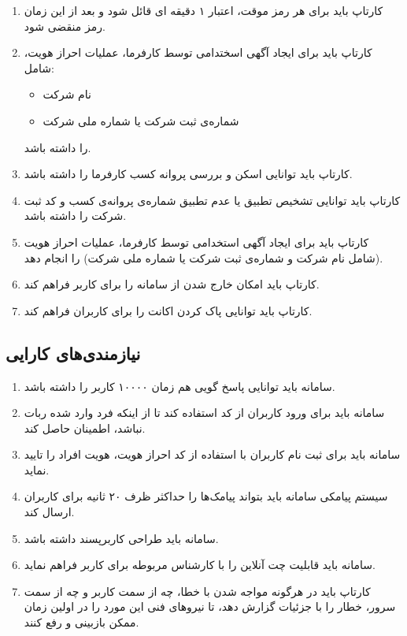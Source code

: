 \documentclass{report}
\begin{document}
\begin{itemize}
\begin{enumerate}
							\item 
							کارتاپ باید برای هر رمز موقت، اعتبار ۱ دقیقه ای قائل شود و بعد از این زمان رمز منقضی شود.
							
							\item 
							کارتاپ باید برای ایجاد آگهی اسختدامی توسط کارفرما، عملیات احراز هویت، شامل:
							\begin{itemize}
								\item نام شرکت
								\item شماره‌ی ثبت شرکت یا شماره ملی شرکت
							\end{itemize}
							را داشته باشد.
							
							\item 
							کارتاپ باید توانایی اسکن و بررسی پروانه کسب کارفرما را داشته باشد.
							
							\item 
							کارتاپ باید توانایی تشخیص تطبیق یا عدم تطبیق شماره‌ی پروانه‌ی کسب و کد ثبت شرکت را داشته باشد.
							
							\item 
							کارتاپ باید برای ایجاد آگهی استخدامی توسط کارفرما، عملیات احراز هویت (شامل نام شرکت و شماره‌ی ثبت شرکت یا شماره ملی شرکت) را انجام دهد.
							
							\item 
							کارتاپ باید امکان خارج شدن از سامانه را برای کاربر فراهم کند.
							\item 
							کارتاپ باید توانایی پاک کردن اکانت را برای کاربران فراهم کند.
						\end{enumerate}
				\end{itemize}
			\subsection{نیازمندی‌های کارایی}
				\begin{enumerate}
					\item 
					سامانه باید توانایی پاسخ گویی هم زمان ۱۰۰۰۰ کاربر را داشته باشد.
					\item 
					سامانه باید برای ورود کاربران از کد \lr{CAPCHA}  استفاده کند تا از اینکه فرد وارد شده ربات نباشد، اطمینان حاصل کند.
					\item 
					سامانه باید برای ثبت نام کاربران با استفاده از کد احراز هویت، هویت افراد را تایید نماید.
					\item 
					سیستم پیامکی سامانه باید بتواند پیامک‌ها را حداکثر ظرف ۲۰ ثانیه برای کاربران ارسال کند.
					\item 
					سامانه باید طراحی کاربرپسند داشته باشد.
					\item 
					سامانه باید قابلیت چت آنلاین را با کارشناس مربوطه برای کاربر فراهم نماید.
					\item 
					کارتاپ باید در هرگونه مواجه شدن با خطا، چه از سمت کاربر و چه از سمت سرور، خطار را با جزئیات گزارش دهد، تا نیروهای فنی این مورد را در اولین زمان ممکن بازبینی و رفع کنند.
				\end{enumerate}
\end{document}
